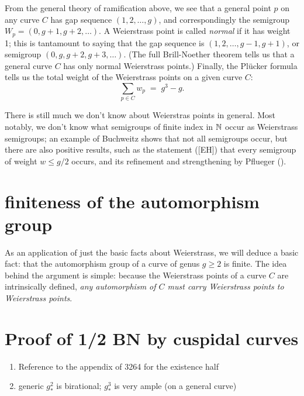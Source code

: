 From the general theory of ramification above, we see that a general point $p$ on any curve $C$ has gap sequence $(1,2,\dots,g)$, and correspondingly the semigroup $W_p = (0, g+1, g+2, \dots)$. A Weierstrass point is called \emph{normal} if it has weight 1; this is tantamount to saying that the gap sequence is $(1,2,\dots,g-1,g+1)$, or semigroup $(0, g, g+2, g+3, \dots)$. (The full Brill-Noether theorem tells us that a general curve $C$ has only normal Weierstrass points.) Finally, the Pl\"ucker formula tells us  the total weight of the Weierstrass points on a given curve $C$:
$$
\sum_{p \in C} w_p \; = \; g^3-g.
$$

There is still much we don't know about Weierstras points in general. Most notably, we don't know what semigroups of finite index in $\NN$ occur as Weierstrass semigroups; an example of Buchweitz shows that not all semigroups occur, but there are also positive results, such as the statement ([EH]) that every semigroup of weight $w \leq g/2$ occurs, and its refinement and strengthening by Pflueger (\cite{**}).

\section{ finiteness of the automorphism group}

As an application of just the basic facts about Weierstrass, we will deduce a basic fact: that the automorphism group of a curve of genus $g\geq 2$ is finite. The idea behind the argument is simple: because the Weierstrass points of a curve $C$ are intrinsically defined, \emph{any automorphism of $C$ must carry Weierstrass points to Weierstrass points}.

\section{Proof of 1/2 BN by cuspidal curves}
\begin{enumerate}
 
\item Reference to the appendix of 3264 for the existence half
\item generic $g^2_*$ is birational; $g^3_*$ is very ample (on a general curve)
\end{enumerate}
